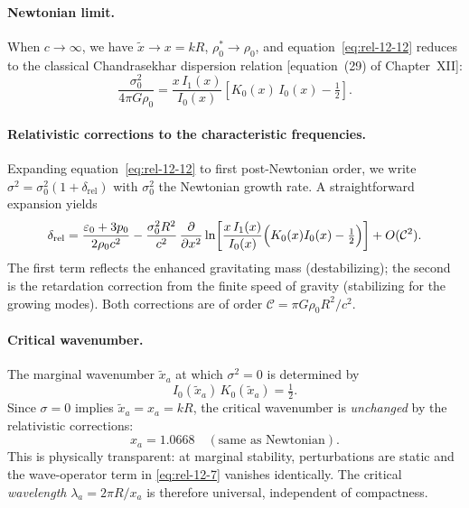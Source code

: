 \paragraph{Newtonian limit.}
When $c\to\infty$, we have $\tilde{x}\to x = kR$, $\rho_{0}^{*}\to\rho_{0}$,
and equation~\eqref{eq:rel-12-12} reduces to the classical
Chandrasekhar dispersion relation [equation~(29) of Chapter~XII]:
\begin{equation}
\label{eq:rel-12-13}
\frac{\sigma_{0}^{2}}{4\pi G\rho_{0}}
  = \frac{x\,I_{1}(x)}{I_{0}(x)}
  \left[K_{0}(x)\,I_{0}(x) - \tfrac{1}{2}\right].
\end{equation}

\paragraph{Relativistic corrections to the characteristic frequencies.}
Expanding equation~\eqref{eq:rel-12-12} to first post-Newtonian order,
we write $\sigma^{2} = \sigma_{0}^{2}(1+\delta_{\mathrm{rel}})$ with
$\sigma_{0}^{2}$ the Newtonian growth rate.  A straightforward expansion
yields
\begin{equation}
\label{eq:rel-12-14}
\delta_{\mathrm{rel}} = \frac{\varepsilon_{0}+3p_{0}}{2\rho_{0}c^{2}}
  - \frac{\sigma_{0}^{2}R^{2}}{c^{2}}\,
  \frac{\partial}{\partial x^{2}}
  \ln\!\left[\frac{x\,I_{1}(x)}{I_{0}(x)}
  \Bigl(K_{0}(x)I_{0}(x)-\tfrac{1}{2}\Bigr)\right]
  + O(\mathcal{C}^{2}).
\end{equation}
The first term reflects the enhanced gravitating mass (destabilizing);
the second is the retardation correction from the finite speed of
gravity (stabilizing for the growing modes).  Both corrections are of
order $\mathcal{C}=\pi G\rho_{0}R^{2}/c^{2}$.

\paragraph{Critical wavenumber.}
The marginal wavenumber $\tilde{x}_{a}$ at which $\sigma^{2}=0$ is
determined by
\begin{equation}
\label{eq:rel-12-15}
I_{0}(\tilde{x}_{a})\,K_{0}(\tilde{x}_{a}) = \tfrac{1}{2}.
\end{equation}
Since $\sigma=0$ implies $\tilde{x}_{a}=x_{a}=kR$, the critical
wavenumber is \emph{unchanged} by the relativistic corrections:
\begin{equation}
\label{eq:rel-12-16}
x_{a} = 1.0668 \quad (\text{same as Newtonian}).
\end{equation}
This is physically transparent: at marginal stability, perturbations are
static and the wave-operator term in \eqref{eq:rel-12-7} vanishes
identically.  The critical \emph{wavelength}
$\lambda_{a}=2\pi R/x_{a}$ is therefore universal, independent of
compactness.

